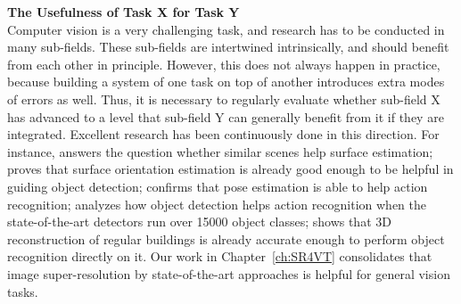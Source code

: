 \textbf{  {The Usefulness of Task X for Task Y} } \\
Computer vision is a very challenging task, and research has to be conducted in many sub-fields. These sub-fields are intertwined intrinsically, and should benefit from each other in principle. However, this does not always happen in practice, because building a system of one task on top of  another  introduces extra modes of errors as well. Thus, it is necessary to regularly evaluate whether sub-field X has advanced to a level that sub-field Y can generally benefit from it if they are integrated.   
Excellent research has been continuously done in this direction. For instance,  \citep{can-similar-scene-help} answers the question whether similar scenes help surface estimation;  \citep{hoiem2008putting} proves that surface orientation estimation is already good enough to be helpful in guiding object detection;
\citep{eth_biwi_00883} confirms that pose estimation is able to help action recognition; \citep{15000object} analyzes how object detection helps action recognition when the state-of-the-art detectors run over 15000 object classes;   
\citep{martinovic20153d} shows that  3D reconstruction of regular buildings is already accurate enough to perform object recognition directly on it. Our work in Chapter~\ref{ch:SR4VT} consolidates that image super-resolution by state-of-the-art approaches is helpful for general vision tasks. 
 
